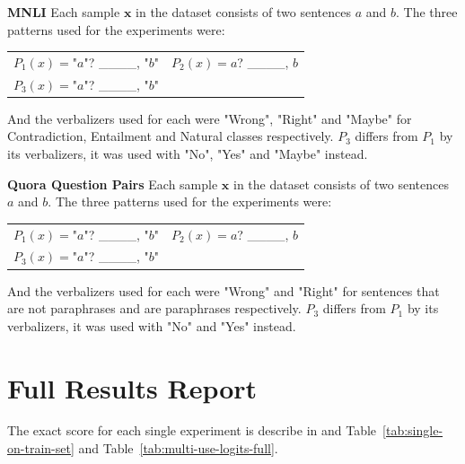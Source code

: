 \documentclass[11pt,a4paper]{article}
\begin{document}
\vspace{8pt}
\noindent \textbf{MNLI} \quad
Each sample $\textbf{x}$ in the dataset consists of two sentences $a$ and $b$.
The three patterns used for the experiments were:
\begin{table}[H]
	\renewcommand{\arraystretch}{1.5}
	\begin{tabularx}{\textwidth}{cc}
		$P_1(x)=$"$a$"? \_\_\_\_, "$b$" & $P_2(x)=$$a$? \_\_\_\_, $b$ \\
		$P_3(x)=$"$a$"? \_\_\_\_, "$b$" & \\
	\end{tabularx}
\end{table}
And the verbalizers used for each were "Wrong", "Right" and "Maybe" for Contradiction, Entailment and Natural classes respectively.
$P_3$ differs from $P_1$ by its verbalizers, it was used with "No", "Yes" and "Maybe" instead.

\vspace{8pt}
\noindent \textbf{Quora Question Pairs} \quad
Each sample $\textbf{x}$ in the dataset consists of two sentences $a$ and $b$.
The three patterns used for the experiments were:
\begin{table}[H]
	\renewcommand{\arraystretch}{1.5}
	\begin{tabularx}{\textwidth}{cc}
		$P_1(x)=$"$a$"? \_\_\_\_, "$b$" & $P_2(x)=$$a$? \_\_\_\_, $b$ \\ 
		$P_3(x)=$"$a$"? \_\_\_\_, "$b$" & \\
	\end{tabularx}
\end{table}
And the verbalizers used for each were "Wrong" and "Right" for sentences that are not paraphrases and are paraphrases respectively.
$P_3$ differs from $P_1$ by its verbalizers, it was used with "No" and "Yes" instead.

\section{Full Results Report}
\label{apx:full-results-report}
The exact score for each single experiment is describe in and Table~\ref{tab:single-on-train-set} and Table~\ref{tab:multi-use-logits-full}.


%
\end{document}
